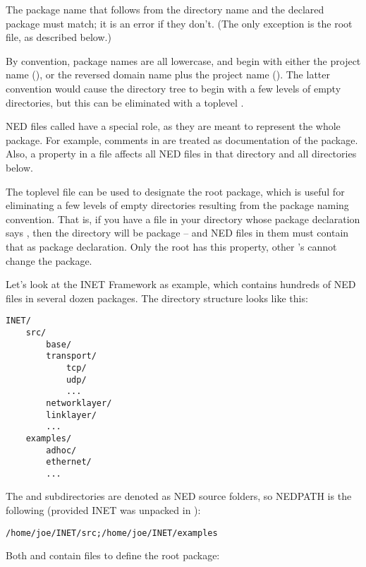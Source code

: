 The package name that follows from the directory name and the declared
package must match; it is an error if they don't. (The only exception
is the root  file, as described below.)

By convention, package names are all lowercase, and begin with either
the project name (), or the reversed domain name plus the
project name (). The latter convention
would cause the directory tree to begin with a few levels of empty
directories, but this can be eliminated with a toplevel .

NED files called  have a special role, as they are meant
to represent the whole package. For example, comments in
 are treated as documentation of the package. Also, a
 property in a  file affects all NED
files in that directory and all directories below.

The toplevel  file can be used to designate the root
package, which is useful for eliminating a few levels of empty directories
resulting from the package naming convention. That is, if you have a
 file in your  directory whose package
declaration says , then the 
directory will be package  -- and NED
files in them must contain that as package declaration. Only the root
 has this property, other 's cannot
change the package.

Let's look at the INET Framework as example, which contains hundreds of NED
files in several dozen packages. The directory structure looks like this:

\begin{Verbatim}
INET/
    src/
        base/
        transport/
            tcp/
            udp/
            ...
        networklayer/
        linklayer/
        ...
    examples/
        adhoc/
        ethernet/
        ...
\end{Verbatim}

The  and  subdirectories are denoted as NED source
folders, so NEDPATH is the following (provided INET was unpacked in
):

\begin{Verbatim}
/home/joe/INET/src;/home/joe/INET/examples
\end{Verbatim}

Both  and  contain  files to
define the root package:

